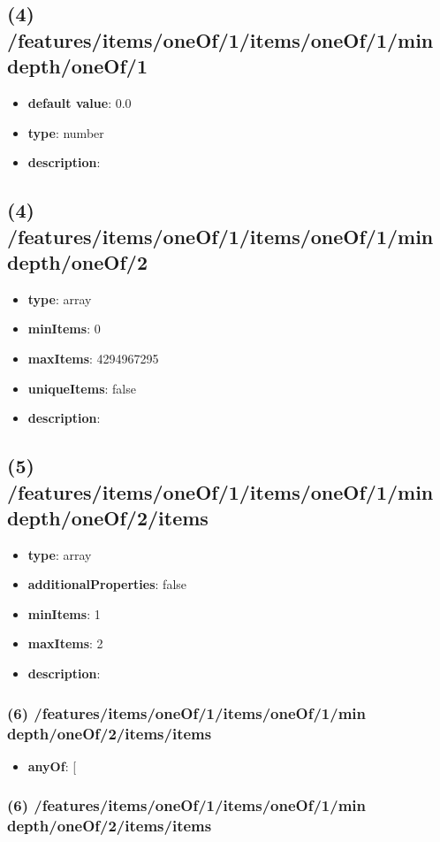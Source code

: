 \subsection{(4) /features/items/oneOf/1/items/oneOf/1/min depth/oneOf/1}
\begin{itemize}[leftmargin=4em]\item {\bf default value}: 0.0
\item {\bf type}: number
\item {\bf description}: 
\end{itemize}\subsection{(4) /features/items/oneOf/1/items/oneOf/1/min depth/oneOf/2}
\begin{itemize}[leftmargin=4em]\item {\bf type}: array
\item {\bf minItems}: 0
\item {\bf maxItems}: 4294967295
\item {\bf uniqueItems}: false
\item {\bf description}: 
\end{itemize}\subsection{(5) /features/items/oneOf/1/items/oneOf/1/min depth/oneOf/2/items}
\begin{itemize}[leftmargin=5em]\item {\bf type}: array
\item {\bf additionalProperties}: false
\item {\bf minItems}: 1
\item {\bf maxItems}: 2
\item {\bf description}: 
\end{itemize}\subsubsection{(6) /features/items/oneOf/1/items/oneOf/1/min depth/oneOf/2/items/items}
\begin{itemize}[leftmargin=6em]\item {\bf anyOf}: [\end{itemize}\subsubsection{(6) /features/items/oneOf/1/items/oneOf/1/min depth/oneOf/2/items/items}
